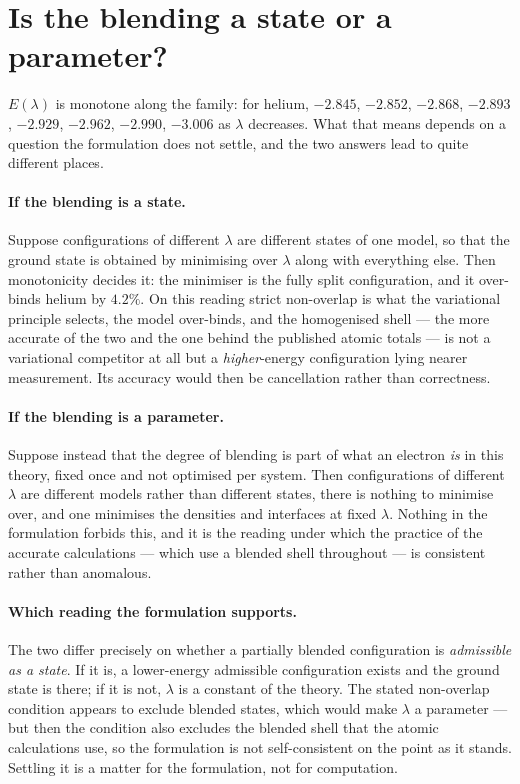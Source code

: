 \documentclass[11pt]{article}
\begin{document}
\section{Is the blending a state or a parameter?}

$E(\lambda)$ is monotone along the family: for helium, $-2.845$, $-2.852$, $-2.868$, $-2.893$,
$-2.929$, $-2.962$, $-2.990$, $-3.006$ as $\lambda$ decreases. What that means depends on a question
the formulation does not settle, and the two answers lead to quite different places.

\paragraph{If the blending is a state.} Suppose configurations of different $\lambda$ are different
states of one model, so that the ground state is obtained by minimising over $\lambda$ along with
everything else. Then monotonicity decides it: the minimiser is the fully split configuration, and it
over-binds helium by $4.2\%$. On this reading strict non-overlap is what the variational principle
selects, the model over-binds, and the homogenised shell --- the more accurate of the two and the one
behind the published atomic totals --- is not a variational competitor at all but a
\emph{higher}-energy configuration lying nearer measurement. Its accuracy would then be cancellation
rather than correctness.

\paragraph{If the blending is a parameter.} Suppose instead that the degree of blending is part of
what an electron \emph{is} in this theory, fixed once and not optimised per system. Then
configurations of different $\lambda$ are different models rather than different states, there is
nothing to minimise over, and one minimises the densities and interfaces at fixed $\lambda$. Nothing
in the formulation forbids this, and it is the reading under which the practice of the accurate
calculations --- which use a blended shell throughout --- is consistent rather than anomalous.

\paragraph{Which reading the formulation supports.} The two differ precisely on whether a partially
blended configuration is \emph{admissible as a state}. If it is, a lower-energy admissible
configuration exists and the ground state is there; if it is not, $\lambda$ is a constant of the
theory. The stated non-overlap condition appears to exclude blended states, which would make
$\lambda$ a parameter --- but then the condition also excludes the blended shell that the atomic
calculations use, so the formulation is not self-consistent on the point as it stands. Settling it is
a matter for the formulation, not for computation.
\end{document}
